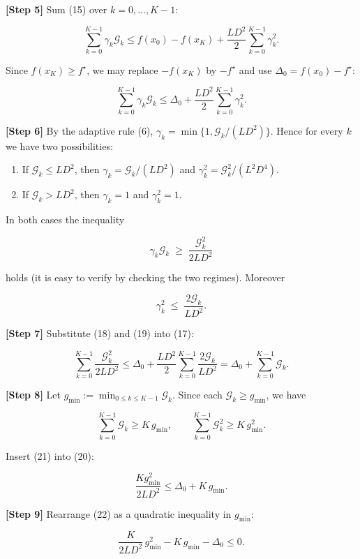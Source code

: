 \documentclass{article}
\newcommand{\gap}{\mathcal{G}}
\newcommand{\diam}{D}
\begin{document}
\noindent\textbf{[Step 5]} Sum (15) over $k=0,\dots,K-1$:

\[
\sum_{k=0}^{K-1}\gamma_{k}\gap_{k}
\le f(x_{0})-f(x_{K})
   +\frac{L\diam^{2}}{2}\sum_{k=0}^{K-1}\gamma_{k}^{2}.
\tag{16}
\]

Since $f(x_{K})\ge f^{\star}$, we may replace $-f(x_{K})$ by $-f^{\star}$ and use $\Delta_{0}=f(x_{0})-f^{\star}$:

\[
\sum_{k=0}^{K-1}\gamma_{k}\gap_{k}
\le \Delta_{0}
   +\frac{L\diam^{2}}{2}\sum_{k=0}^{K-1}\gamma_{k}^{2}.
\tag{17}
\]

\noindent\textbf{[Step 6]} By the adaptive rule (6), $\gamma_{k}= \min\{1,\gap_{k}/(L\diam^{2})\}$.  
Hence for every $k$ we have two possibilities:

\begin{enumerate}
  \item If $\gap_{k}\le L\diam^{2}$, then $\gamma_{k}= \gap_{k}/(L\diam^{2})$ and
        $\gamma_{k}^{2}= \gap_{k}^{2}/(L^{2}\diam^{4})$.
  \item If $\gap_{k}> L\diam^{2}$, then $\gamma_{k}=1$ and $\gamma_{k}^{2}=1$.
\end{enumerate}

In both cases the inequality  

\[
\gamma_{k}\gap_{k}\;\ge\;\frac{\gap_{k}^{2}}{2L\diam^{2}}
\tag{18}
\]

holds (it is easy to verify by checking the two regimes).  Moreover  

\[
\gamma_{k}^{2}\;\le\;\frac{2\gap_{k}}{L\diam^{2}}.
\tag{19}
\]

\noindent\textbf{[Step 7]} Substitute (18) and (19) into (17):

\[
\sum_{k=0}^{K-1}\frac{\gap_{k}^{2}}{2L\diam^{2}}
\le \Delta_{0}
   +\frac{L\diam^{2}}{2}\sum_{k=0}^{K-1}\frac{2\gap_{k}}{L\diam^{2}}
   =\Delta_{0}+ \sum_{k=0}^{K-1}\gap_{k}.
\tag{20}
\]

\noindent\textbf{[Step 8]} Let $g_{\min}:=\min_{0\le k\le K-1}\gap_{k}$.  Since each $\gap_{k}\ge g_{\min}$, we have  

\[
\sum_{k=0}^{K-1}\gap_{k}\ge K\,g_{\min},\qquad
\sum_{k=0}^{K-1}\gap_{k}^{2}\ge K\,g_{\min}^{2}.
\tag{21}
\]

Insert (21) into (20):

\[
\frac{K g_{\min}^{2}}{2L\diam^{2}}
\le \Delta_{0}+ K\,g_{\min}.
\tag{22}
\]

\noindent\textbf{[Step 9]} Rearrange (22) as a quadratic inequality in $g_{\min}$:

\[
\frac{K}{2L\diam^{2}}\,g_{\min}^{2} - K\,g_{\min} -\Delta_{0}\le 0.
\tag{23}
\]
\end{document}
